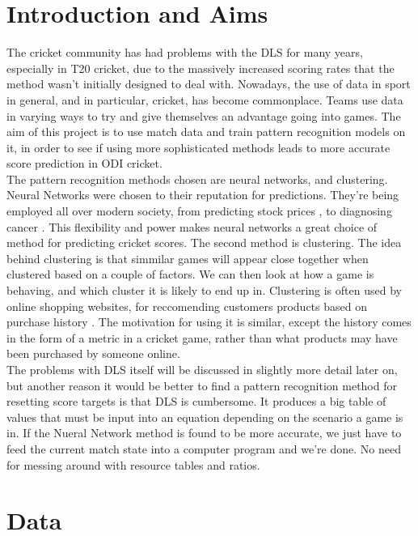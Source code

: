\documentclass[11pt]{amsart}
\begin{document}
\section{Introduction and Aims}
The cricket community has had problems with the DLS for many years, especially in T20 cricket, due to the massively increased scoring rates that the method 
wasn't initially designed to deal with. Nowadays, the use of data in sport in general, and in particular, cricket, has become commonplace. Teams use data in varying
ways to try and give themselves an advantage going into games. The aim of this project is to use match data and train pattern recognition models on it, 
in order to see if using more sophisticated methods leads to more accurate score prediction in ODI cricket. \\

The pattern recognition methods chosen are neural networks, and clustering. Neural Networks were chosen to their reputation for predictions. They're being employed
all over modern society, from predicting stock prices \cite{nnstock}, to diagnosing cancer \cite{nncancer}. This flexibility and power makes neural networks 
a great choice of method for predicting cricket scores. The second method is clustering. The idea behind clustering is that simmilar games will appear close together 
when clustered based on a couple of factors. We can then look at how a game is behaving, and which cluster it is likely to end up in. Clustering is often used 
by online shopping websites, for reccomending customers products based on purchase history \cite{retailClus}. The motivation for using it is similar, except the history
comes in the form of a metric in a cricket game, rather than what products may have been purchased by someone online. \\

The problems with DLS itself will be discussed in slightly more detail later on, but another reason it would be better to find a pattern recognition method for resetting score targets
is that DLS is cumbersome. It produces a big table of values that must be input into an equation depending on the scenario a game is in. If the Nueral Network method 
is found to be more accurate, we just have to feed the current match state into a computer program and we're done. No need for messing around with resource tables and ratios. 


\section{Data}
\end{document}
